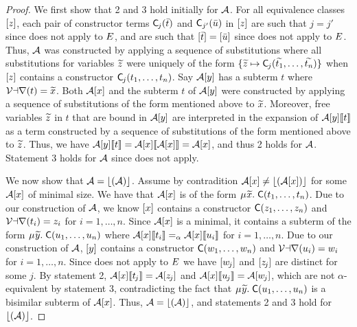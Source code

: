 \begin{report}
\begin{proof}
We first show that 2 and 3 hold initially for $\mathcal{A}$.
For all equivalence classes $[z]$,
each pair of constructor terms $\textsf{C}_{\kern-0.083333em j}( \bar t )$ and $\textsf{C}_{j'}( \bar u )$ in $[z]$
are such that $j = j'$ since  does not apply to $E$,
and are such that $[ \bar t ] = [ \bar u ]$ since  does not apply to $E$.
Thus, 
$\mathcal{A}$ was constructed by applying a sequence of substitutions
where all substitutions for variables ${\widetilde{z}}$ 
were uniquely of the form $\{ {\widetilde{z}} \mapsto \textsf{C}_{\kern-0.083333em j}( {\widetilde{t_1}}, \ldots, {\widetilde{t_n}} ) \}$
when $[z]$ contains a constructor $\textsf{C}_{\kern-0.083333em j}( t_1, \ldots, t_n )$.
Say $\mathcal{A} [y]$ has a subterm $t$ where $\mathcal{Var}(t) = {\widetilde{x}}$.
Both $\mathcal{A} [x]$ and the subterm $t$ of $\mathcal{A} [y]$ were
constructed by applying a sequence of substitutions of the form mentioned above to ${\widetilde{x}}$.
Moreover, free variables ${\widetilde{z}}$ in $t$ that are bound in $\mathcal{A} [y]$ are interpreted in 
the expansion of $\mathcal{A} [y] \llbracket  t  \rrbracket$ as a term
constructed by a sequence of substitutions of the form mentioned above to ${\widetilde{z}}$. 
Thus, we have
$\mathcal{A} [y] \llbracket  t  \rrbracket = \mathcal{A} [x] \llbracket  \mathcal{A} [x]  \rrbracket = \mathcal{A} [x]$, and thus 2 holds for $\mathcal{A}$.
Statement 3 holds for $\mathcal{A}$ since  does not apply.

We now show that $\mathcal{A} = \lfloor(\mathcal{A})\rfloor$.
Assume by contradition $\mathcal{A} [x] \neq \lfloor(\mathcal{A} [x])\rfloor$ for some $\mathcal{A} [x]$ of minimal size.
We have that $\mathcal{A} [x]$ is of the form $\MU {\Varec{x}}.\; \const{C}( t_1, \ldots, t_n )$.
Due to our construction of $\mathcal{A}$, 
we know $[x]$ contains a constructor $\textsf{C}( z_1, \ldots, z_n )$ and $\mathcal{Var}( t_i ) = z_i$ for $i = 1, \ldots, n$.
Since $\mathcal{A} [x]$ is a minimal, it
contains a subterm of the form $\MU {\Varec{y}}.\; \const{C}( u_1, \ldots, u_n )$
where $\mathcal{A} [x] \llbracket  t_i  \rrbracket \mathrel{=_\alpha} \mathcal{A} [x] \llbracket  u_i  \rrbracket$ for $i = 1, \ldots, n$.
Due to our construction of $\mathcal{A}$, $[y]$ contains a constructor $\textsf{C}( w_1, \ldots, w_n )$ and $\mathcal{Var}( u_i ) = w_i$ for $i = 1, \ldots, n$.
Since  does not apply to $E$
we have $[w_{\kern-0.083333em j}]$ and $[z_{\kern-0.083333em j}]$ are distinct for some $j$.
By statement 2, $\mathcal{A} [x] \llbracket  t_{\kern-0.083333em j}  \rrbracket = \mathcal{A} [z_{\kern-0.083333em j}]$
and $\mathcal{A} [x] \llbracket  u_{\kern-0.083333em j}  \rrbracket = \mathcal{A} [w_{\kern-0.083333em j}]$,
which are not $\alpha$-equivalent by statement 3, contradicting the fact that $\MU {\Varec{y}}.\; \const{C}( u_1, \ldots, u_n )$ is a bisimilar subterm of $\mathcal{A} [x]$.
Thus, $\mathcal{A} = \lfloor(\mathcal{A})\rfloor$, and statements 2 and 3 hold for $\lfloor(\mathcal{A})\rfloor$.


\end{proof}
\end{report}
